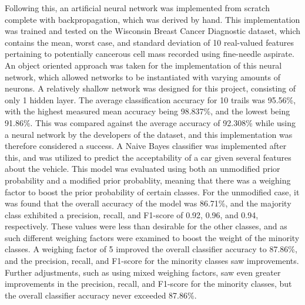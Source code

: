\documentclass[a4paper]{article}
\begin{document}
Following this, an artificial neural network was implemented from scratch complete with backpropagation, which was derived by hand. This implementation was trained and tested on the Wisconsin Breast Cancer Diagnostic dataset, which contains the mean, worst case, and standard deviation of 10 real-valued features pertaining to potentially cancerous cell mass recorded using fine-needle aspirate. An object oriented approach was taken for the implementation of this neural network, which allowed networks to be instantiated with varying amounts of neurons. A relatively shallow network was designed for this project, consisting of only 1 hidden layer. The average classification accuracy for 10 trails was 95.56\%, with the highest measured mean accuracy being 98.837\%, and the lowest being 91.86\%. This was compared against the average accuracy of 92.308\% while using a neural network by the developers of the dataset, and this implementation was therefore considered a success. A Naive Bayes classifier was implemented after this, and was utilized to predict the acceptability of a car given several features about the vehicle. This model was evaluated using both an unmodified prior probability and a modified prior probablity, meaning that there was a weighing factor to boost the prior probability of certain classes. For the unmodified case, it was found that the overall accuracy of the model was 86.71\%, and the majority class exhibited a precision, recall, and F1-score of 0.92, 0.96, and 0.94, respectively. These values were less than desirable for the other classes, and as such different weighing factors were examined to boost the weight of the minority classes. A weighing factor of 5 improved the overall classifier accuracy to 87.86\%, and the precision, recall, and F1-score for the minority classes saw improvements. Further adjustments, such as using mixed weighing factors, saw even greater improvements in the precision, recall, and F1-score for the minority classes, but the overall classifier accuracy never exceeded 87.86\%.
\end{document}
